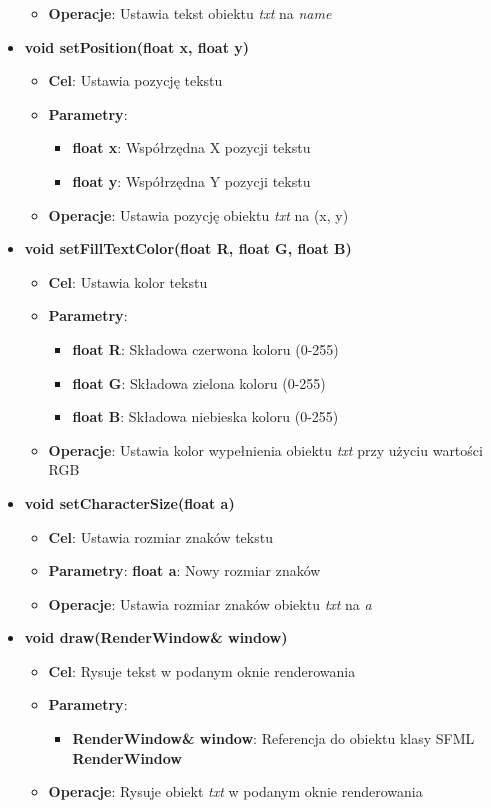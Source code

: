 \documentclass[a4paper, 10pt]{article}
\begin{document}
\begin{itemize}
\begin{itemize}
			\item \textbf{Operacje}: Ustawia tekst obiektu \emph{txt} na \emph{name}
		\end{itemize}
	\item \textbf{void setPosition(float x, float y)}
		\begin{itemize}
			\item \textbf{Cel}: Ustawia pozycję tekstu
			\item \textbf{Parametry}:
				\begin{itemize}
					\item \textbf{float x}: Współrzędna X pozycji tekstu
					\item \textbf{float y}: Współrzędna Y pozycji tekstu
				\end{itemize}
			\item \textbf{Operacje}: Ustawia pozycję obiektu \emph{txt} na (x, y)
		\end{itemize}
	\item \textbf{void setFillTextColor(float R, float G, float B)}
		\begin{itemize}
			\item \textbf{Cel}: Ustawia kolor tekstu
			\item \textbf{Parametry}:
				\begin{itemize}
					\item \textbf{float R}: Składowa czerwona koloru (0-255)
					\item \textbf{float G}: Składowa zielona koloru (0-255)
					\item \textbf{float B}: Składowa niebieska koloru (0-255)
				\end{itemize}
			\item \textbf{Operacje}: Ustawia kolor wypełnienia obiektu \emph{txt} przy użyciu wartości RGB
		\end{itemize}
	\item \textbf{void setCharacterSize(float a)}
		\begin{itemize}
			\item \textbf{Cel}: Ustawia rozmiar znaków tekstu
			\item \textbf{Parametry}: \textbf{float a}: Nowy rozmiar znaków
			\item \textbf{Operacje}: Ustawia rozmiar znaków obiektu \emph{txt} na \emph{a}
		\end{itemize}
	\item \textbf{void draw(RenderWindow\& window)}
		\begin{itemize}
			\item \textbf{Cel}: Rysuje tekst w podanym oknie renderowania
			\item \textbf{Parametry}:
				\begin{itemize}
					\item \textbf{RenderWindow\& window}: Referencja do obiektu klasy SFML \textbf{RenderWindow}
				\end{itemize}
			\item \textbf{Operacje}: Rysuje obiekt \emph{txt} w podanym oknie renderowania
		\end{itemize}

\end{itemize}
\end{document}

